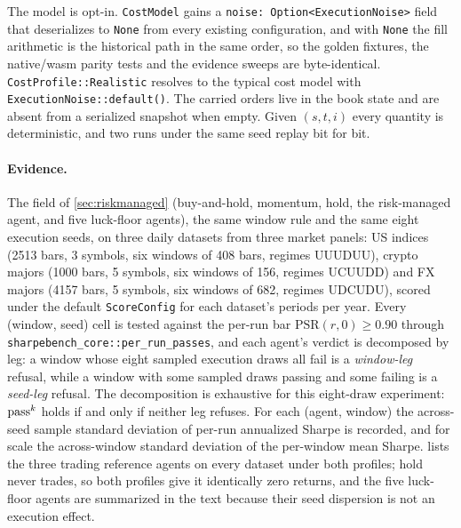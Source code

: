The model is opt-in. \texttt{CostModel} gains a \texttt{noise: Option<ExecutionNoise>} field that deserializes to \texttt{None} from every existing configuration, and with \texttt{None} the fill arithmetic is the historical path in the same order, so the golden fixtures, the native/wasm parity tests and the evidence sweeps are byte-identical. \texttt{CostProfile::Realistic} resolves to the typical cost model with \texttt{ExecutionNoise::default()}. The carried orders live in the book state and are absent from a serialized snapshot when empty. Given $(s, t, i)$ every quantity is deterministic, and two runs under the same seed replay bit for bit.

\paragraph{Evidence.} The field of \cref{sec:riskmanaged} (buy-and-hold, momentum, hold, the risk-managed agent, and five luck-floor agents), the same window rule and the same eight execution seeds, on three daily datasets from three market panels: US indices (2513 bars, 3 symbols, six windows of 408 bars, regimes UUUDUU), crypto majors (1000 bars, 5 symbols, six windows of 156, regimes UCUUDD) and FX majors (4157 bars, 5 symbols, six windows of 682, regimes UDCUDU), scored under the default \texttt{ScoreConfig} for each dataset's periods per year. Every (window, seed) cell is tested against the per-run bar $\text{PSR}(r, 0) \ge 0.90$ through \texttt{sharpebench\_core::per\_run\_passes}, and each agent's verdict is decomposed by leg: a window whose eight sampled execution draws all fail is a \emph{window-leg} refusal, while a window with some sampled draws passing and some failing is a \emph{seed-leg} refusal. The decomposition is exhaustive for this eight-draw experiment: $\text{pass}^{k}$ holds if and only if neither leg refuses. For each (agent, window) the across-seed sample standard deviation of per-run annualized Sharpe is recorded, and for scale the across-window standard deviation of the per-window mean Sharpe.  lists the three trading reference agents on every dataset under both profiles; hold never trades, so both profiles give it identically zero returns, and the five luck-floor agents are summarized in the text because their seed dispersion is not an execution effect.

